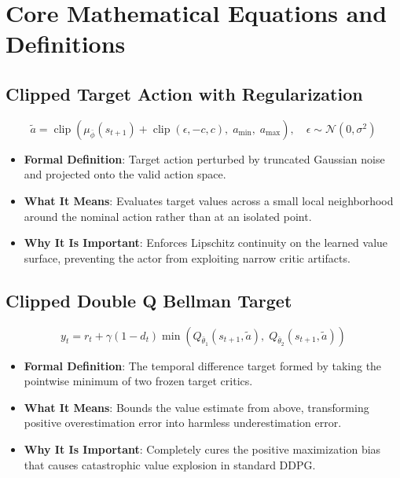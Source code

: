 \documentclass[11pt,a4paper]{article}
\theoremstyle{definition}
\begin{document}
\section{Core Mathematical Equations and Definitions}

\subsection{Clipped Target Action with Regularization}
{\boldmath
\begin{equation}
\tilde{a} = \operatorname{clip}\left( \mu_{\bar{\phi}}(s_{t+1}) + \operatorname{clip}(\epsilon, -c, c), \; a_{\min}, \; a_{\max} \right), \quad \epsilon \sim \mathcal{N}(0, \sigma^2)
\end{equation}
}
\begin{itemize}
    \item \textbf{Formal Definition}: Target action perturbed by truncated Gaussian noise and projected onto the valid action space.
    \item \textbf{What It Means}: Evaluates target values across a small local neighborhood around the nominal action rather than at an isolated point.
    \item \textbf{Why It Is Important}: Enforces Lipschitz continuity on the learned value surface, preventing the actor from exploiting narrow critic artifacts.
\end{itemize}

\subsection{Clipped Double Q Bellman Target}
{\boldmath
\begin{equation}
y_t = r_t + \gamma (1 - d_t) \min\left( Q_{\bar{\theta}_1}(s_{t+1}, \tilde{a}), \; Q_{\bar{\theta}_2}(s_{t+1}, \tilde{a}) \right)
\end{equation}
}
\begin{itemize}
    \item \textbf{Formal Definition}: The temporal difference target formed by taking the pointwise minimum of two frozen target critics.
    \item \textbf{What It Means}: Bounds the value estimate from above, transforming positive overestimation error into harmless underestimation error.
    \item \textbf{Why It Is Important}: Completely cures the positive maximization bias that causes catastrophic value explosion in standard DDPG.
\end{itemize}
\end{document}
